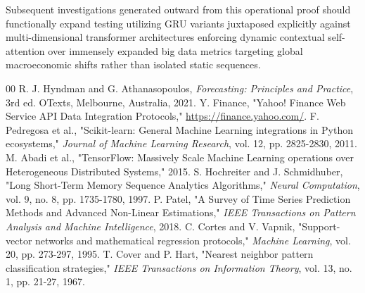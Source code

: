 \documentclass[12pt,onecolumn]{IEEEtran}
\begin{document}
Subsequent investigations generated outward from this operational proof should functionally expand testing utilizing GRU variants juxtaposed explicitly against multi-dimensional transformer architectures enforcing dynamic contextual self-attention over immensely expanded big data metrics targeting global macroeconomic shifts rather than isolated static sequences.

\begin{thebibliography}{00}
 R. J. Hyndman and G. Athanasopoulos, \textit{Forecasting: Principles and Practice}, 3rd ed. OTexts, Melbourne, Australia, 2021.
 Y. Finance, "Yahoo! Finance Web Service API Data Integration Protocols," \url{https://finance.yahoo.com/}.
 F. Pedregosa et al., "Scikit-learn: General Machine Learning integrations in Python ecosystems," \textit{Journal of Machine Learning Research}, vol. 12, pp. 2825-2830, 2011.
 M. Abadi et al., "TensorFlow: Massively Scale Machine Learning operations over Heterogeneous Distributed Systems," 2015.
 S. Hochreiter and J. Schmidhuber, "Long Short-Term Memory Sequence Analytics Algorithms," \textit{Neural Computation}, vol. 9, no. 8, pp. 1735-1780, 1997.
 P. Patel, "A Survey of Time Series Prediction Methods and Advanced Non-Linear Estimations," \textit{IEEE Transactions on Pattern Analysis and Machine Intelligence}, 2018.
 C. Cortes and V. Vapnik, "Support-vector networks and mathematical regression protocols," \textit{Machine Learning}, vol. 20, pp. 273-297, 1995.
 T. Cover and P. Hart, "Nearest neighbor pattern classification strategies," \textit{IEEE Transactions on Information Theory}, vol. 13, no. 1, pp. 21-27, 1967.
\end{thebibliography}
\end{document}
